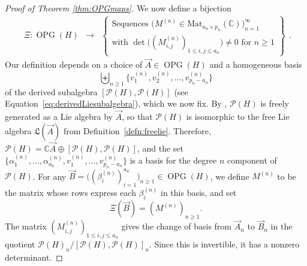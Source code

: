 \documentclass[11pt]{amsart}
\theoremstyle{definition}
\numberwithin{equation}{section}
\def\CC{{\mathbb C}}
\newcommand{\OPG}{\operatorname{OPG}}
\begin{document}
\begin{proof}[Proof of Theorem \ref{thm:OPGmaps}]
We now define a bijection
\[
\begin{array}{rcl}
\Xi: \OPG(H) &\to& \left\{ \begin{array}{c}
\text{Sequences $\big(M^{(n)} \in \mathrm{Mat}_{a_{n} \times p_{n}}(\CC)\big)_{n=1}^{\infty}$ } \\
\text{with $\det\big( (M^{(n)}_{i, j})_{1 \le i, j \le a_{n}} \big) \neq 0$ for $n \ge 1$}
\end{array}\right\}
\end{array}.
\]
Our definition depends on a choice of $\vec{A} \in \OPG(H)$ and a homogeneous basis 
\[
\biguplus_{n \geq 1}\{v_1^{(n)},v_2^{(n)},\ldots,v_{p_n - a_n}^{(n)}\}
\]
of the derived subalgebra $[\mathcal{P}(H),\mathcal{P}(H)]$  (see Equation~\eqref{eq:derivedLiesubalgebra}), which we now fix.  
By \cite[Prop. 2.4]{F23}, $\mathcal{P}(H)$ is freely generated as a Lie algebra by $\vec{A}$, so that $\mathcal{P}(H)$ is isomorphic to the free Lie algebra $\mathfrak{L}(\vec{A})$ from Definition~\ref{defn:freelie}.  
Therefore, $\mathcal{P}(H) = \CC \vec{A} \oplus [\mathcal{P}(H), \mathcal{P}(H)]$, and the set $\{\alpha_{1}^{(n)}, \ldots, \alpha_{a_{n}}^{(n)}, v_{1}^{(n)}, \ldots, v_{p_n - a_n}^{(n)}\}$ is a basis for the degree $n$ component of $\mathcal{P}(H)$.  
For any $\vec{B} = \big((\beta_{i}^{(n)})_{i=1}^{a_{n}}\big)_{n \ge 1} \in \OPG(H)$, we define $M^{(n)}$ to be the matrix whose rows express each $\beta_{i}^{(n)}$ in this basis, and set
\[
\Xi(\vec{B}) = (M^{(n)})_{n \ge 1}.
\]
The matrix $(M^{(n)}_{i, j})_{1 \le i, j \le a_{n}}$ gives the change of basis from $\vec{A}_{n}$ to $\vec{B}_{n}$ in the quotient $\mathcal{P}(H)_{n}/[\mathcal{P}(H),\mathcal{P}(H)]_{n}$.  Since this is invertible, it has a nonzero determinant.


\end{proof}
\end{document}
